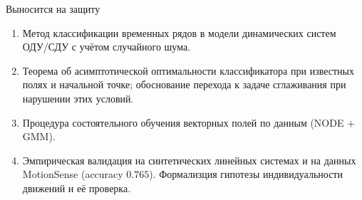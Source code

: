 \documentclass[10pt]{beamer}
\begin{document}
	\begin{frame}{Выносится на защиту}

		\begin{enumerate}
			\item Метод классификации временных рядов в модели динамических систем ОДУ/СДУ с учётом случайного шума.
			\item Теорема об асимптотической оптимальности классификатора при известных полях и начальной точке; обоснование перехода к задаче сглаживания при нарушении этих условий.
			\item Процедура состоятельного обучения векторных полей по данным (NODE + GMM).
			\item Эмпирическая валидация на синтетических линейных системах и на данных MotionSense (accuracy $0.765$). Формализция гипотезы индивидуальности движений и её проверка.
		\end{enumerate}

	\end{frame}
\end{document}
